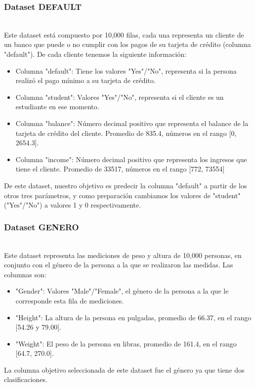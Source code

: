 \documentclass[sigconf,authorversion,nonacm]{acmart}
\begin{document}
\subsubsection{Dataset DEFAULT}\hfill\\
Este dataset está compuesto por 10,000 filas, cada una representa un cliente de un banco que puede o no cumplir con los pagos de su tarjeta de crédito (columna "default"). De cada cliente tenemos la siguiente información:
\begin{itemize}
  \item Columna "default": Tiene los valores "Yes"/"No", representa si la persona realizó el pago mínimo a su tarjeta de crédito.
  \item Columna "student": Valores "Yes"/"No", representa si el cliente es un estudiante en ese momento.
  \item Columna "balance": Número decimal positivo que representa el balance de la tarjeta de crédito del cliente. Promedio de 835.4, números en el rango [0, 2654.3].
  \item Columna "income": Número decimal positivo que representa los ingresos que tiene el cliente. Promedio de 33517, números en el rango [772, 73554]
\end{itemize}

De este dataset, nuestro objetivo es predecir la columna "default" a partir de los otros tres parámetros, y como preparación cambiamos los valores de "student" ("Yes"/"No") a valores 1 y 0 respectivamente.


\subsubsection{Dataset GENERO}\hfill\\
Este dataset representa las mediciones de peso y altura de 10,000 personas, en conjunto con el género de la persona a la que se realizaron las medidas. Las columnas son:
\begin{itemize}
  \item "Gender": Valores "Male"/"Female", el género de la persona a la que le corresponde esta fila de mediciones.
  \item "Height": La altura de la persona en pulgadas, promedio de 66.37, en el rango [54.26 y 79.00].
  \item "Weight": El peso de la persona en libras, promedio de 161.4, en el rango [64.7, 270.0].
\end{itemize}

La columna objetivo seleccionada de este dataset fue el género ya que tiene dos clasificaciones.
\end{document}
